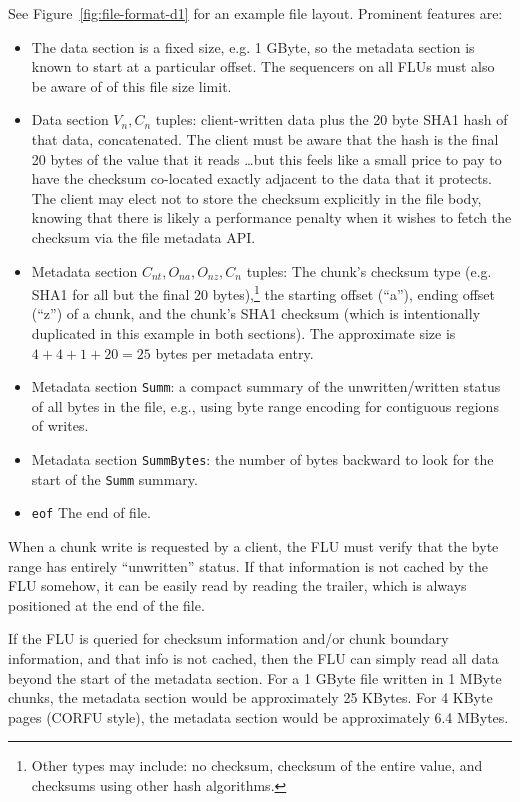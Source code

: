 \documentclass[preprint,10pt]{sigplanconf}
\begin{document}
See Figure~\ref{fig:file-format-d1} for an example file layout.
Prominent features are:

\begin{itemize}
\item The data section is a fixed size, e.g. 1 GByte, so the metadata
  section is known to start at a particular offset.
  The sequencers on all FLUs must also be aware of of this file size
  limit.
\item Data section $V_n,C_n$ tuples: client-written data plus the 20
  byte SHA1 hash of that data, concatenated.  The client must be aware
  that the hash is the final 20 bytes of the value that it reads
  \ldots but this feels like a small price to pay to have the checksum
  co-located exactly adjacent to the data that it protects. 
  The client may elect not to store the checksum explicitly in the
  file body, knowing that there is likely a performance penalty when
  it wishes to fetch the checksum via the file metadata API.
\item Metadata section $C_{nt},O_{na},O_{nz},C_n$ tuples:
  The chunk's
  checksum type (e.g. SHA1 for all but the final
  20 bytes),\footnote{Other types may include: no checksum, checksum
    of the entire value, and checksums using other hash algorithms.}
  the starting
  offset (``a''), ending offset (``z'') of a chunk, and the
  chunk's SHA1 checksum (which is intentionally duplicated in this
  example in both sections).  The approximate size is
  $4 + 4 + 1 + 20 = 25$ bytes per metadata entry.
\item Metadata section {\tt Summ}: a compact summary of the
  unwritten/written status of all bytes in the file, e.g., using byte
  range encoding for contiguous regions of writes. 
\item Metadata section {\tt SummBytes}: the number of bytes backward
  to look for the start of the {\tt Summ} summary. 
\item {\tt eof} The end of file.
\end{itemize}

When a chunk write is requested by a client, the FLU must verify that
the byte range has entirely ``unwritten'' status.  If that information
is not cached by the FLU somehow, it can be easily read by reading the
trailer, which is always positioned at the end of the file.

If the FLU is queried for checksum information and/or chunk boundary
information, and that info is not cached, then the FLU can simply read
all data beyond the start of the metadata section.  For a 1 GByte file
written in 1 MByte chunks, the metadata section
would be approximately 25 KBytes.  For 4 KByte pages (CORFU style), the
metadata section would be approximately 6.4 MBytes.
\end{document}
